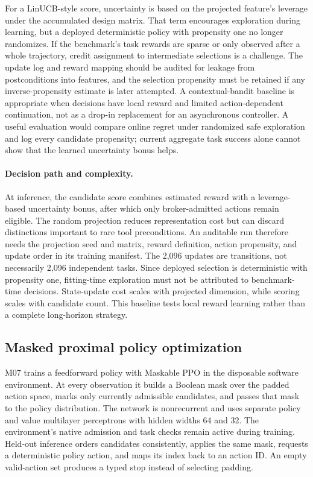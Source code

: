For a LinUCB-style score, uncertainty is based on the projected feature's leverage under the accumulated design matrix. That term encourages exploration during learning, but a deployed deterministic policy with propensity one no longer randomizes. If the benchmark's task rewards are sparse or only observed after a whole trajectory, credit assignment to intermediate selections is a challenge. The update log and reward mapping should be audited for leakage from postconditions into features, and the selection propensity must be retained if any inverse-propensity estimate is later attempted. A contextual-bandit baseline is appropriate when decisions have local reward and limited action-dependent continuation, not as a drop-in replacement for an asynchronous controller. A useful evaluation would compare online regret under randomized safe exploration and log every candidate propensity; current aggregate task success alone cannot show that the learned uncertainty bonus helps.


\paragraph{Decision path and complexity.} At inference, the candidate score combines estimated reward with a leverage-based uncertainty bonus, after which only broker-admitted actions remain eligible. The random projection reduces representation cost but can discard distinctions important to rare tool preconditions. An auditable run therefore needs the projection seed and matrix, reward definition, action propensity, and update order in its training manifest. The 2,096 updates are transitions, not necessarily 2,096 independent tasks. Since deployed selection is deterministic with propensity one, fitting-time exploration must not be attributed to benchmark-time decisions. State-update cost scales with projected dimension, while scoring scales with candidate count. This baseline tests local reward learning rather than a complete long-horizon strategy.

\subsection{Masked proximal policy optimization}\label{sec:method-m07}
M07 trains a feedforward policy with Maskable PPO in the disposable software environment. At every observation it builds a Boolean mask over the padded action space, marks only currently admissible candidates, and passes that mask to the policy distribution. The network is nonrecurrent and uses separate policy and value multilayer perceptrons with hidden widths 64 and 32. The environment's native admission and task checks remain active during training. Held-out inference orders candidates consistently, applies the same mask, requests a deterministic policy action, and maps its index back to an action ID. An empty valid-action set produces a typed stop instead of selecting padding.

